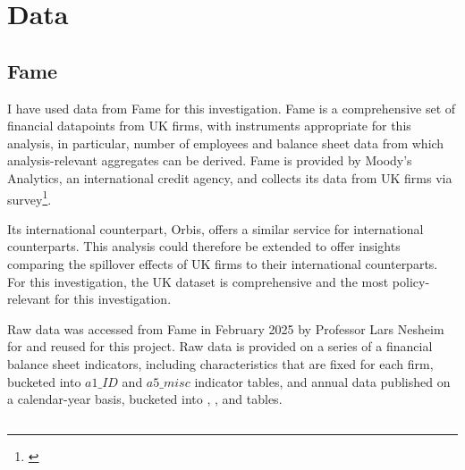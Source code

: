 \section{Data}

\subsection{Fame}

I have used data from Fame for this investigation.
Fame is a comprehensive set of financial datapoints from UK firms, with instruments appropriate for this analysis,
in particular, number of employees and balance sheet data from which analysis-relevant aggregates can be derived.
Fame is provided by Moody's Analytics, an international credit agency,
and collects its data from UK firms via survey\footnote{\cite{MoodysAnalytics2026}}.
\par
Its international counterpart, Orbis, offers a similar service for international counterparts.
This analysis could therefore be extended to offer insights comparing the spillover effects of UK firms to their international counterparts.
For this investigation, the UK dataset is comprehensive and the most policy-relevant for this investigation.
\par
Raw data was accessed from Fame in February 2025 by Professor Lars Nesheim for \cite{Irastorza-Fadrique2026}
and reused for this project. Raw data is provided on a series of a financial balance sheet indicators,
including characteristics that are fixed for each firm, bucketed into $a1\_ID$ and $a5\_misc$ indicator tables,
and annual data published on a calendar-year basis,
bucketed into , , and  tables.

\subsection{}

